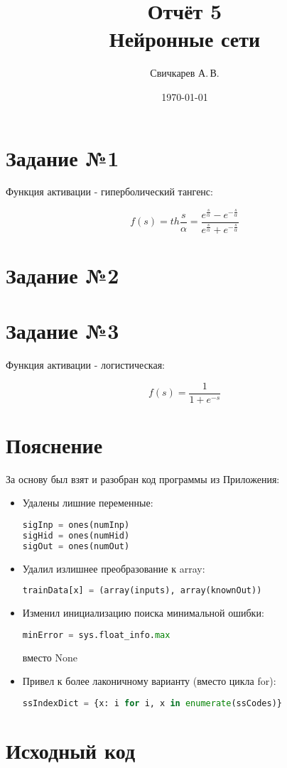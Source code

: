 \documentclass{article} %
\title{Отчёт 5\protect\\Нейронные сети} %
\author{Свичкарев А.\,В.} %
\date{\today} %
\begin{document}

\maketitle %

\section{Задание №1}
Функция активации - гиперболический тангенс:

\[f(s)=th\frac{s}{\alpha}=\frac{e^\frac{s}{\alpha}-e^{-\frac{s}{\alpha}}}{e^\frac{s}{\alpha}+e^{-\frac{s}{\alpha}}}\]

\section{Задание №2}

\section{Задание №3}
Функция активации - логистическая:

\[f(s)=\frac{1}{1+e^{-s}}\]

\section{Пояснение}
За основу был взят и разобран код программы из Приложения:
\begin{itemize}
	\item Удалены лишние переменные:
		\begin{lstlisting}[language=Python]
sigInp = ones(numInp)
sigHid = ones(numHid)
sigOut = ones(numOut)
		\end{lstlisting}
	\item Удалил излишнее преобразование к array:
		\begin{lstlisting}[language=Python]
trainData[x] = (array(inputs), array(knownOut))
		\end{lstlisting}
	\item Изменил инициализацию поиска минимальной ошибки:
		\begin{lstlisting}[language=Python]
minError = sys.float_info.max
		\end{lstlisting}
вместо None
	\item Привел к более лаконичному варианту (вместо цикла for):
		\begin{lstlisting}[language=Python]
ssIndexDict = {x: i for i, x in enumerate(ssCodes)}
		\end{lstlisting}
\end{itemize}

\section{Исходный код}
% 
\end{document}

